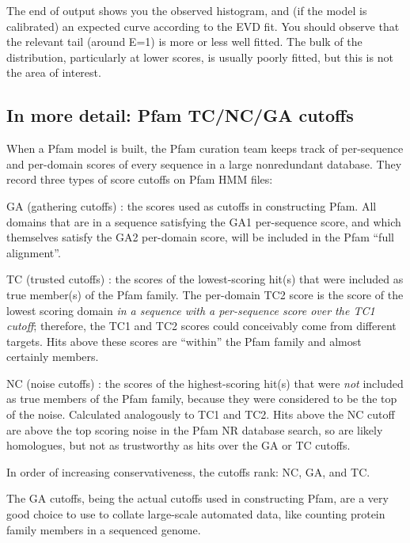 The end of  output shows you the observed histogram,
and (if the model is calibrated) an expected curve according to the
EVD fit. You should observe that the relevant tail (around E=1) is
more or less well fitted. The bulk of the distribution, particularly
at lower scores, is usually poorly fitted, but this is not the area of
interest.

\subsection{In more detail: Pfam TC/NC/GA cutoffs}

When a Pfam model is built, the Pfam curation team keeps track of
per-sequence and per-domain scores of every sequence in a large
nonredundant database. They record three types of score cutoffs on
Pfam HMM files:

\begin{wideitem}
\item[GA (gathering cutoffs)]: the scores used as cutoffs in
constructing Pfam. All domains that are in a sequence satisfying the
GA1 per-sequence score, and which themselves satisfy the GA2
per-domain score, will be included in the Pfam ``full alignment''.

\item[TC (trusted cutoffs)]: the scores of the lowest-scoring hit(s)
that were included as true member(s) of the Pfam family. The
per-domain TC2 score is the score of the lowest scoring domain
\textit{in a sequence with a per-sequence score over the TC1 cutoff};
therefore, the TC1 and TC2 scores could conceivably come from
different targets. Hits above these scores are ``within'' the Pfam
family and almost certainly members.

\item[NC (noise cutoffs)]: the scores of the highest-scoring
hit(s) that were \textit{not} included as true members of the Pfam
family, because they were considered to be the top of the noise.
Calculated analogously to TC1 and TC2. Hits above the NC cutoff are
above the top scoring noise in the Pfam NR database search, so are
likely homologues, but not as trustworthy as hits over the GA or TC
cutoffs.
\end{wideitem}

In order of increasing conservativeness, the cutoffs rank: NC, GA, and
TC.

The GA cutoffs, being the actual cutoffs used in constructing Pfam,
are a very good choice to use to collate large-scale automated data,
like counting protein family members in a sequenced genome.

